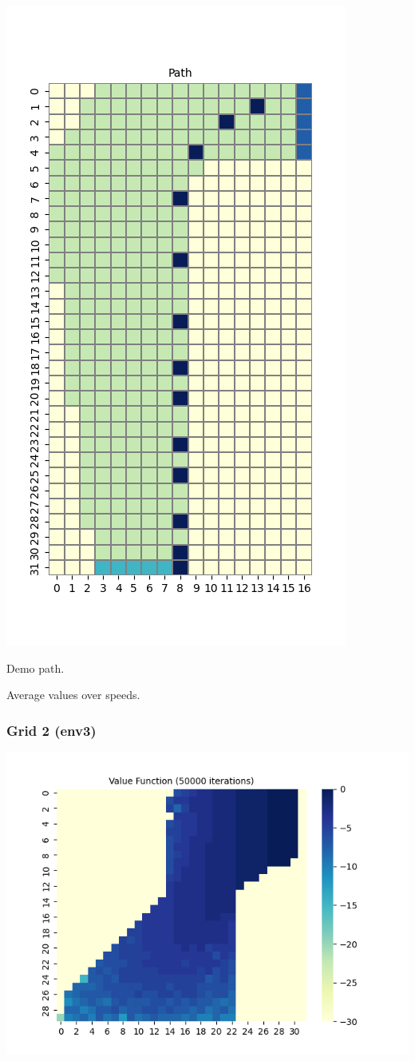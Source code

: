 \documentclass[11pt]{article}
\begin{document}
    \includegraphics[scale=0.7]{env2_demo_e_5_12_8}

    Demo path.

    Average values over speeds.

    \subsubsection{Grid 2 (env3)}

    \includegraphics[scale=0.7]{env3_5_3_1_max}
\end{document}
